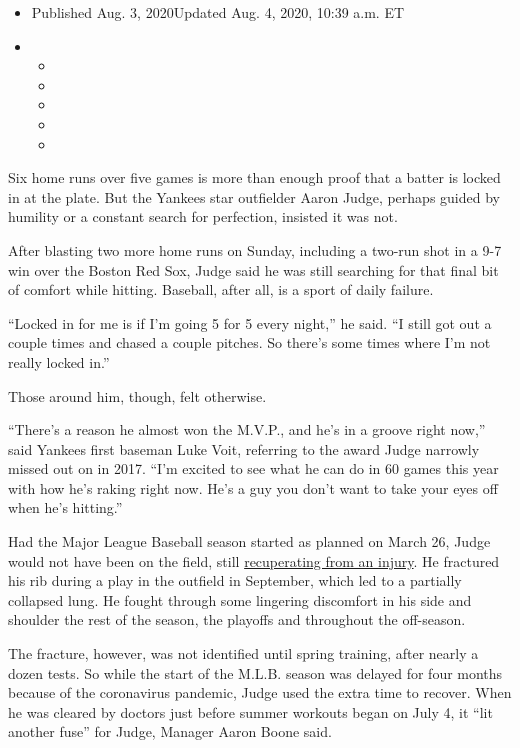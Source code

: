\begin{itemize}
\item
  Published Aug. 3, 2020Updated Aug. 4, 2020, 10:39 a.m. ET
\item
  \begin{itemize}
  \item
  \item
  \item
  \item
  \item
  \end{itemize}
\end{itemize}

Six home runs over five games is more than enough proof that a batter is
locked in at the plate. But the Yankees star outfielder Aaron Judge,
perhaps guided by humility or a constant search for perfection, insisted
it was not.

After blasting two more home runs on Sunday, including a two-run shot in
a 9-7 win over the Boston Red Sox, Judge said he was still searching for
that final bit of comfort while hitting. Baseball, after all, is a sport
of daily failure.

``Locked in for me is if I'm going 5 for 5 every night,'' he said. ``I
still got out a couple times and chased a couple pitches. So there's
some times where I'm not really locked in.''

Those around him, though, felt otherwise.

``There's a reason he almost won the M.V.P., and he's in a groove right
now,'' said Yankees first baseman Luke Voit, referring to the award
Judge narrowly missed out on in 2017. ``I'm excited to see what he can
do in 60 games this year with how he's raking right now. He's a guy you
don't want to take your eyes off when he's hitting.''

Had the Major League Baseball season started as planned on March 26,
Judge would not have been on the field, still
\href{https://www.nytimes.com/2020/03/06/sports/baseball/aaron-judge-yankees.html}{recuperating
from an injury}. He fractured his rib during a play in the outfield in
September, which led to a partially collapsed lung. He fought through
some lingering discomfort in his side and shoulder the rest of the
season, the playoffs and throughout the off-season.

The fracture, however, was not identified until spring training, after
nearly a dozen tests. So while the start of the M.L.B. season was
delayed for four months because of the coronavirus pandemic, Judge used
the extra time to recover. When he was cleared by doctors just before
summer workouts began on July 4, it ``lit another fuse'' for Judge,
Manager Aaron Boone said.


